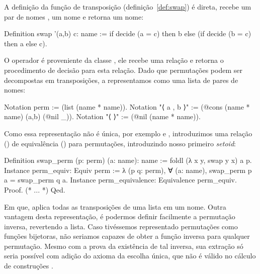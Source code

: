 A definição da função de transposição (definição~\ref{def:swap}) é direta, recebe um par de nomes , um nome  e retorna um nome:
\begin{coqcode}
Definition swap '(a,b) c: name :=
   if decide (a = c) then b else (if decide (b = c) then a else c).
\end{coqcode}
O operador  é proveniente da classe , ele recebe uma relação e retorna o procedimento de decisão para esta relação. 
Dado que permutações podem ser decompostas em transposições, a representamos como uma lista de pares de nomes:
\begin{coqcode}
Notation perm := (list (name * name)).
Notation "⟨ a , b ⟩" := (@cons (name * name) (a,b) (@nil _)).
Notation "⟨ ⟩" := (@nil (name * name)).
\end{coqcode}
Como essa representação não é única, por exemplo  e , introduzimos uma relação () de equivalência () para permutações, introduzindo nosso primeiro \textit{setoid}:
\begin{coqcode}
Definition swap_perm (p: perm) (a: name): name :=
   foldl (λ x y, swap y x) a p.
Instance perm_equiv: Equiv perm :=
   λ (p q: perm), ∀ (a: name), swap_perm p a = swap_perm q a.
Instance perm_equivalence: Equivalence perm_equiv. Proof. (* ... *) Qed.
\end{coqcode}
Em que,  aplica todas as transposições de uma lista em um nome. Outra vantagem desta representação, é podermos definir facilmente a permutação inversa, revertendo a lista. Caso tivéssemos representado permutações como funções bijetoras, não seriamos capazes de obter a função inversa para qualquer permutação. Mesmo com a prova da existência de tal inversa, sua extração só seria possível com adição do axioma da escolha única, que não é válido no cálculo de construções \cite{Maietti2017}.


